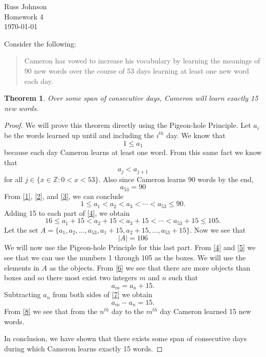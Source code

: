 \documentclass[12pt]{article}
\newtheorem{thm}{Theorem}
\begin{document}
\begin{flushright}
Russ Johnson\\
Homework 4\\
\today\\
\end{flushright}

\noindent Consider the following:
\begin{quote}
Cameron has vowed to increase his vocabulary by learning the meanings of 90 new words over the course of 53 days learning at least one new word each day.
\end{quote}

\begin{thm}
Over some span of consecutive days, Cameron will learn exactly 15 new words.
\end{thm}

\begin{proof}
We will prove this theorem directly using the Pigeon-hole Principle. Let $a_i$ be the words learned up until and including the $i^{th}$ day. We know that
\begin{equation}\label{1}
1 \leq a_1
\end{equation}
because each day Cameron learns at least one word. From this same fact we know that
\begin{equation}\label{2}
a_j < a_{j+1}
\end{equation}
for all $j\in\{x\in \mathbb{Z}:0<x<53\}$.
Also since Cameron learns 90 words by the end,
\begin{equation}\label{3}
a_{53} = 90
\end{equation}
From \eqref{1}, \eqref{2}, and \eqref{3}, we can conclude
\begin{equation}\label{4}
1 \leq a_1 < a_2 < a_3 < \cdots < a_{53} \leq 90.
\end{equation}
Adding 15 to each part of \eqref{4}, we obtain
\begin{equation}\label{5}
16 \leq a_1+15 < a_2+15 < a_3+15 < \cdots < a_{53}+15 \leq 105.
\end{equation}
Let the set $A = \{a_1,a_2,\ldots,a_{53},a_1+15,a_2+15,\ldots,a_{53}+15\}$. Now we see that 
\begin{equation}\label{6}
|A| = 106
\end{equation}
We will now use the Pigeon-hole Principle for this last part. From \eqref{4} and \eqref{5} we see that we can use the numbers 1 through 105 as the boxes. We will use the elements in $A$ as the objects. From \eqref{6} we see that there are more objects than boxes and so there most exist two integers $m$ and $n$ such that
\begin{equation}\label{7}
a_m = a_n+15.
\end{equation}
Subtracting $a_n$ from both sides of \eqref{7} we obtain
\begin{equation}\label{8}
a_m-a_n = 15.
\end{equation}
From \eqref{8} we see that from the $n^{th}$ day to the $m^{th}$ day Cameron learned 15 new words.

In conclusion, we have shown that there exists some span of consecutive days during which Cameron learns exactly 15 words.

\end{proof}
\end{document}
